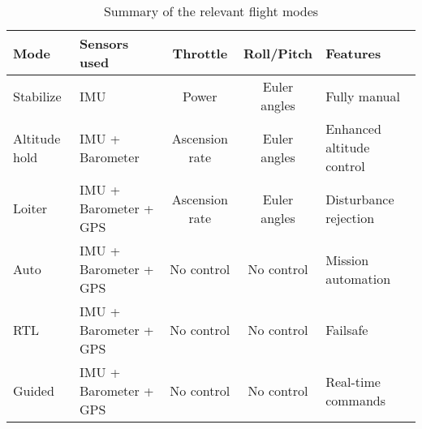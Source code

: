 
\begin{table}[htbp]
\centering
\begin{tabular}{lm{3.1cm}ccm{3.5cm}} 
	\hline
	\bfseries Mode	& \bfseries Sensors used	& \bfseries Throttle	&	\bfseries Roll/Pitch	&	\bfseries Features	\\
	\hline
	Stabilize		&	IMU					&	Power			&	Euler angles		&	Fully manual			\\
	Altitude hold	&	IMU + Barometer		&	Ascension rate	&	Euler angles		&	Enhanced altitude control\\
	Loiter			&	IMU + Barometer + GPS&	Ascension rate	&	Euler angles		&	Disturbance rejection	\\
	Auto			&	IMU + Barometer + GPS&	No control		&	No control			&	Mission automation		\\
	RTL				&	IMU + Barometer + GPS&	No control		&	No control			&	Failsafe				\\
	Guided			&	IMU + Barometer + GPS&	No control		&	No control			&	Real-time commands		\\
	\hline
\end{tabular}
\caption{Summary of the relevant flight modes}
\label{tab:modes}
\end{table}
